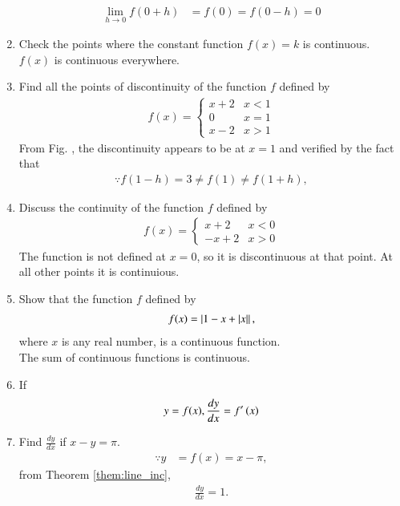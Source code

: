 \begin{enumerate}[label=\arabic*.,ref=\thesubsection.\theenumi]
\begin{align}
\lim_{h\to 0}f(0+h) &= f(0) = f(0-h)  = 0
\end{align}
%
\item Check the points where the constant function $f(x) = k$ is continuous.
\\
\solution $f(x)$ is continuous everywhere.
%
\item Find all the points of discontinuity of the function $f$ defined by 
%
\begin{align}
f(x)  = 
\begin{cases}
x+2 & x < 1
\\
0 & x = 1
\\
x-2 & x > 1
\end{cases}
\end{align}
\solution From  Fig. ,  the discontinuity appears to be at $x = 1$ and verified by the fact that
%
\begin{align}
\because f(1-h) = 3 \ne f(1) \ne f(1+h),
\end{align}
%
\item Discuss the continuity of the function $f$ defined by 
%
\begin{align}
f(x)  = 
\begin{cases}
x+2 & x < 0
\\
-x+2 & x > 0
\end{cases}
\end{align}
%
The function is not defined at $x = 0$, so it is discontinuous at that point.  At all other points it is continuious.
\item Show that the function $f$ defined by 
%
\begin{align}
f(x)  = \left\vert1-x+\left\vert x\right\vert\right\vert,
\end{align}
%
where $x$ is any real number, is a continuous function.
\\
\solution The sum of continuous functions is continuous.
\item If 
\label{def:dydx}
%
\begin{align}
y = f(x), \frac{dy}{dx} = f^{\prime}\left(x\right)
\end{align}
%
\item Find $\frac{dy}{dx}$ if $x-y = \pi$.
%
\\
\solution 
%
\begin{align}
\because y &= f(x) = x -\pi, 
\end{align}
%
from Theorem \ref{them:line_inc},
%
\begin{align}
\frac{dy}{dx} = 1.
\end{align}

\end{enumerate}
